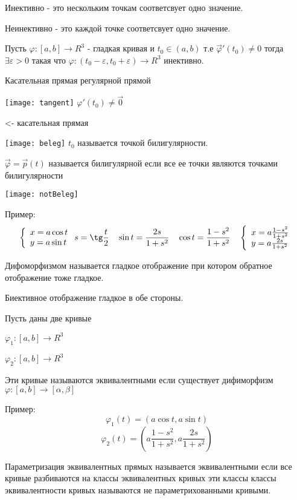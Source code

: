 Инективно - это нескольким точкам соответсвует одно значение.

Неинективно - это каждой точке соответсвует одно значение.

\begin{theorem}
  Пусть $\varphi : [a,b] \to R^3$ - гладкая кривая и $t_0 \in (a,b)$ т.е
  $\vec \varphi' (t_0) \not = 0$ тогда $\exists \varepsilon > 0$ такая что
  $\varphi : (t_0 - \varepsilon, t_0 + \varepsilon) \to R^3$ инективно.
\end{theorem}

Касательная прямая регулярной прямой

  \texttt{[image: tangent]}
$\varphi' (t_0) \not = \vec 0$

<- касательная прямая

  \texttt{[image: beleg]}
$t_0$ называется точкой билигулярности.

$\vec \varphi = \vec p(t)$ называется билигулярной если все ее точки являются
точками билигулярности

  \texttt{[image: notBeleg]}

Пример:
$$
\left\{
\begin{array}{l}
x = a \cos t \\
y = a \sin t
\end{array}
\right.
s = \tg \frac{t}{2} ~~~ \sin t = \frac{2s}{1+s^2} ~~~
\cos t = \frac{1-s^2}{1+s^2} ~~~
\left\{
\begin{array}{l}
x = a \frac{1-s^2}{1+s^2} \\
y = a \frac{2s}{1+s^2}
\end{array}
\right.
$$

Дифоморфизмом называется гладкое отображение при котором обратное отображение
тоже гладкое.

Биективное отображение гладкое в обе стороны.

\begin{define}
  Пусть даны две кривые

  $\varphi_1 : [a,b] \to R^3$

  $\varphi_2 : [a,b] \to R^3$

  Эти кривые называются эквивалентными если существует дифиморфизм
  $\varphi : [a,b] \to [\alpha, \beta]$
\end{define}

Пример:
$$
\varphi_1(t) = (a\cos t, a \sin t)
$$
$$
\varphi_2(t) = (a \frac{1-s^2}{1+s^2}, a \frac{2s}{1+s^2})
$$

Параметризация эквивалентных прямых называется эквивалентными если все кривые
разбиваются на классы эквивалентных кривых эти классы классы эквивалентности
кривых называются не параметрихованными кривыми.